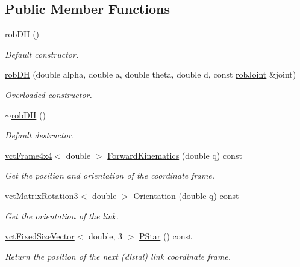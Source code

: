 \subsection*{Public Member Functions}
\begin{DoxyCompactItemize}
\item 
\hyperlink{classrob_d_h_af53c2219f28c3c3d76dfcec27693d8d7}{rob\-D\-H} ()
\begin{DoxyCompactList}\small\item\em Default constructor. \end{DoxyCompactList}\item 
\hyperlink{classrob_d_h_ae7919ad5cd95f4bf5aefeb7d7515a95f}{rob\-D\-H} (double alpha, double a, double theta, double d, const \hyperlink{classrob_joint}{rob\-Joint} \&joint)
\begin{DoxyCompactList}\small\item\em Overloaded constructor. \end{DoxyCompactList}\item 
\hyperlink{classrob_d_h_a8d612b9672a85a282d49dd07e151fdcf}{$\sim$rob\-D\-H} ()
\begin{DoxyCompactList}\small\item\em Default destructor. \end{DoxyCompactList}\item 
\hyperlink{classvct_frame4x4}{vct\-Frame4x4}$<$ double $>$ \hyperlink{classrob_d_h_a9af5ef66e5269ce07b75a892428cabdd}{Forward\-Kinematics} (double q) const 
\begin{DoxyCompactList}\small\item\em Get the position and orientation of the coordinate frame. \end{DoxyCompactList}\item 
\hyperlink{classvct_matrix_rotation3}{vct\-Matrix\-Rotation3}$<$ double $>$ \hyperlink{classrob_d_h_adcd73e6facecdcf4ba1972aaa93994a6}{Orientation} (double q) const 
\begin{DoxyCompactList}\small\item\em Get the orientation of the link. \end{DoxyCompactList}\item 
\hyperlink{classvct_fixed_size_vector}{vct\-Fixed\-Size\-Vector}$<$ double, 3 $>$ \hyperlink{classrob_d_h_ace414bb1d30d48e9d1d239e597921b65}{P\-Star} () const 
\begin{DoxyCompactList}\small\item\em Return the position of the next (distal) link coordinate frame. \end{DoxyCompactList}\item 

\end{DoxyCompactItemize}
